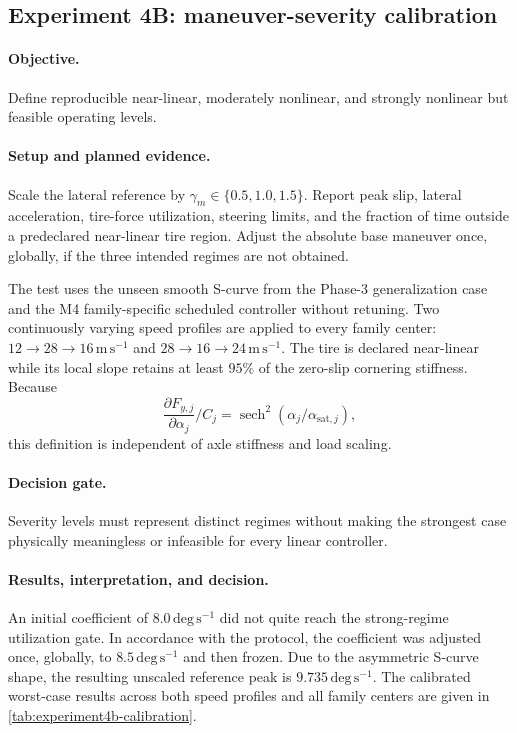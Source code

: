 \subsection{Experiment 4B: maneuver-severity calibration}
\label{sec:experiment4b}
\paragraph{Objective.}
Define reproducible near-linear, moderately nonlinear, and strongly nonlinear but
feasible operating levels.

\paragraph{Setup and planned evidence.}
Scale the lateral reference by
$\gamma_m\in\{0.5,1.0,1.5\}$. Report peak slip, lateral acceleration, tire-force
utilization, steering limits, and the fraction of time outside a predeclared
near-linear tire region. Adjust the absolute base maneuver once, globally, if the
three intended regimes are not obtained.

The test uses the unseen smooth S-curve from the Phase-3 generalization case and
the M4 family-specific scheduled controller without retuning. Two continuously
varying speed profiles are applied to every family center:
$12\rightarrow28\rightarrow16\,\mathrm{m\,s^{-1}}$ and
$28\rightarrow16\rightarrow24\,\mathrm{m\,s^{-1}}$. The tire is declared
near-linear while its local slope retains at least $95\%$ of the zero-slip
cornering stiffness. Because
\begin{equation}
 \frac{\partial F_{y,j}}{\partial \alpha_j}/C_j
 =\operatorname{sech}^2(\alpha_j/\alpha_{\mathrm{sat},j}),
\end{equation}
this definition is independent of axle stiffness and load scaling.

\paragraph{Decision gate.}
Severity levels must represent distinct regimes without making the strongest case
physically meaningless or infeasible for every linear controller.

\paragraph{Results, interpretation, and decision.}
An initial coefficient of $8.0\,\mathrm{deg\,s^{-1}}$ did not quite reach the
strong-regime utilization gate. In accordance with the protocol, the coefficient
was adjusted once, globally, to $8.5\,\mathrm{deg\,s^{-1}}$ and then frozen. Due
to the asymmetric S-curve shape, the resulting unscaled reference peak is
$9.735\,\mathrm{deg\,s^{-1}}$. The calibrated worst-case results across both
speed profiles and all family centers are given in
\cref{tab:experiment4b-calibration}.

